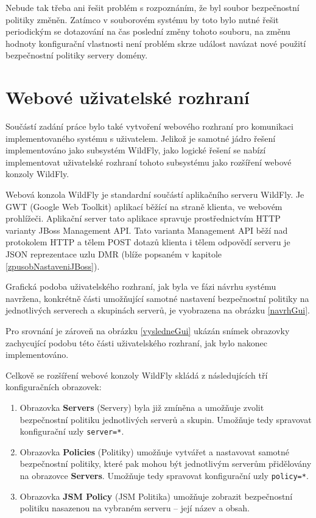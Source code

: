Nebude tak třeba ani řešit problém s rozpoznáním, že byl soubor bezpečnostní politiky změněn. Zatímco v souborovém systému by toto bylo nutné řešit periodickým se dotazování na čas poslední změny tohoto souboru, na změnu hodnoty konfigurační vlastnosti není problém skrze událost navázat nové použití bezpečnostní politiky servery domény.

\section{Webové uživatelské rozhraní} \label{navrhGUI}

Součástí zadání práce bylo také vytvoření webového rozhraní pro komunikaci implementovaného systému s uživatelem.
Jelikož je samotné jádro řešení implementováno jako subsystém WildFly, jako logické řešení se nabízí implementovat uživatelské rozhraní tohoto subsystému jako rozšíření webové konzoly WildFly.

Webová konzola WildFly je standardní součástí aplikačního serveru WildFly. Je GWT (Google Web Toolkit) aplikací běžící na straně klienta, ve webovém prohlížeči.
Aplikační server tato aplikace spravuje prostřednictvím HTTP varianty JBoss Management API.
Tato varianta Management API běží nad protokolem HTTP a tělem POST dotazů klienta i tělem odpovědí serveru je JSON reprezentace uzlu DMR (blíže popsaném v kapitole \ref{zpusobNastaveniJBoss}).
\cite{WildFlyManagementAPIreference}

Grafická podoba uživatelského rozhraní, jak byla ve fázi návrhu systému navržena, konkrétně části umožňující samotné nastavení bezpečnostní politiky na jednotlivých serverech a skupinách serverů, je vyobrazena na obrázku \ref{navrhGui}.

Pro srovnání je zároveň na obrázku \ref{vysledneGui} ukázán snímek obrazovky zachycující podobu této části uživatelského rozhraní, jak bylo nakonec implementováno.

Celkově se rozšíření webové konzoly WildFly skládá z následujících tří konfiguračních obrazovek:

\begin{enumerate}
  
  \item Obrazovka {\bf Servers} (Servery) byla již zmíněna a umožňuje zvolit bezpečnostní politiku jednotlivých serverů a skupin. Umožňuje tedy spravovat konfigurační uzly {\tt server=*}.
  
  \item Obrazovka {\bf Policies} (Politiky) umožňuje vytvářet a nastavovat samotné bezpečnostní politiky, které pak mohou být jednotlivým serverům přidělovány na obrazovce {\bf Servers}. Umožňuje tedy spravovat konfigurační uzly {\tt policy=*}.
  
  \item Obrazovka {\bf JSM Policy} (JSM Politika) umožňuje zobrazit bezpečnostní politiku nasazenou na vybraném serveru -- její název a obsah.
  
\end{enumerate}

